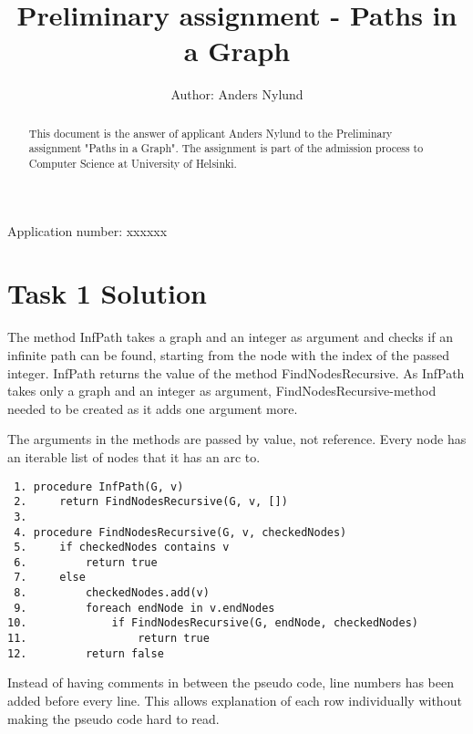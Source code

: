 \documentclass[]{article}
\title{Preliminary assignment - Paths in a Graph}
\author{Author: Anders Nylund}
\begin{document}
\maketitle

\begin{center}
	Application number: xxxxxx
\end{center}

\begin{abstract}
This document is the answer of applicant Anders Nylund to the Preliminary assignment "Paths in a Graph". The assignment is part of the admission process to Computer Science at University of Helsinki.
\end{abstract}

\newpage
\section*{Task 1 Solution}

The method InfPath takes a graph and an integer as argument and checks if an infinite path can be found, starting from the node with the index of the passed integer. InfPath returns the value of the method FindNodesRecursive. As InfPath takes only a graph and an integer as argument, FindNodesRecursive-method needed to be created as it adds one argument more.  

The arguments in the methods are passed by value, not reference. Every node has an iterable list of nodes that it has an arc to.

\begin{lstlisting}
 1.	procedure InfPath(G, v)
 2.		return FindNodesRecursive(G, v, [])
 3.
 4.	procedure FindNodesRecursive(G, v, checkedNodes)
 5.		if checkedNodes contains v
 6.			return true
 7.		else
 8.			checkedNodes.add(v)
 9.			foreach endNode in v.endNodes
10.				if FindNodesRecursive(G, endNode, checkedNodes)
11.					return true
12.			return false
\end{lstlisting}

Instead of having comments in between the pseudo code, line numbers has been added before every line. This allows explanation of each row individually without making the pseudo code hard to read.
\end{document}
